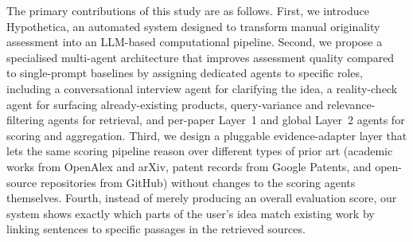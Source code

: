 The primary contributions of this study are as follows. First, we introduce Hypothetica, an automated system designed to transform manual originality assessment into an LLM-based computational pipeline. Second, we propose a specialised multi-agent architecture that improves assessment quality compared to single-prompt baselines by assigning dedicated agents to specific roles, including a conversational interview agent for clarifying the idea, a reality-check agent for surfacing already-existing products, query-variance and relevance-filtering agents for retrieval, and per-paper Layer~1 and global Layer~2 agents for scoring and aggregation. Third, we design a pluggable evidence-adapter layer that lets the same scoring pipeline reason over different types of prior art (academic works from OpenAlex and arXiv, patent records from Google Patents, and open-source repositories from GitHub) without changes to the scoring agents themselves. Fourth, instead of merely producing an overall evaluation score, our system shows exactly which parts of the user's idea match existing work by linking sentences to specific passages in the retrieved sources.

